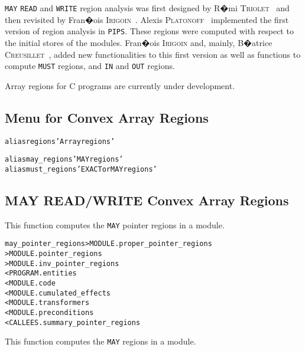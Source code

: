 \documentclass[a4paper]{report}
\newenvironment{PipsMake}{\begin{alltt}}{\end{alltt}}
\newenvironment{PipsPass}[1]{\label{pass:#1}}{}
\newcommand{\Pips}{\texttt{PIPS}}
\begin{document}
\begin{PipsPass}{regions}
\verb+MAY+ \verb+READ+ and \verb+WRITE+ region analysis was first designed
by R�mi \textsc{Triolet}~\cite{Tri84} and then revisited by Fran�ois
\textsc{Irigoin}~\cite{TIF86}. Alexis \textsc{Platonoff}~\cite{Pla90}
implemented the first version of region analysis in \Pips{}. These
regions were computed with respect to the initial stores of the
modules. Fran�ois \textsc{Irigoin} and, mainly, B�atrice
\textsc{Creusillet}~\cite{CI95,CI96,Cre96}, added new functionalities to
this first version as well as functions to compute \verb+MUST+
regions, and \verb+IN+ and \verb+OUT+ regions.

Array regions for C programs are currently under development.


\end{PipsPass}

\subsection{Menu for Convex Array Regions}

\begin{PipsMake}
alias regions 'Array regions'

alias may_regions 'MAY regions'
alias must_regions 'EXACT or MAY regions'
\end{PipsMake}

\subsection{MAY READ/WRITE Convex Array Regions}
\label{subsubsection-may-regions}

\begin{PipsPass}{may_pointer_regions}
This function computes the \verb|MAY| pointer regions in a module.
\end{PipsPass}
\begin{PipsMake}
may_pointer_regions             > MODULE.proper_pointer_regions
                                > MODULE.pointer_regions
                                > MODULE.inv_pointer_regions
        < PROGRAM.entities
        < MODULE.code
        < MODULE.cumulated_effects
        < MODULE.transformers
        < MODULE.preconditions
        < CALLEES.summary_pointer_regions
\end{PipsMake}

\begin{PipsPass}{may_regions}
This function computes the \verb|MAY| regions in a module.
\end{PipsPass}
\end{document}
